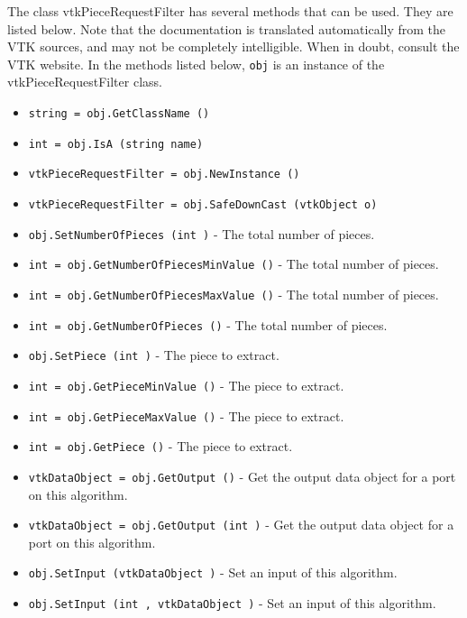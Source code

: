 The class vtkPieceRequestFilter has several methods that can be used.
  They are listed below.
Note that the documentation is translated automatically from the VTK sources,
and may not be completely intelligible.  When in doubt, consult the VTK website.
In the methods listed below, \verb|obj| is an instance of the vtkPieceRequestFilter class.
\begin{itemize}
\item  \verb|string = obj.GetClassName ()|

\item  \verb|int = obj.IsA (string name)|

\item  \verb|vtkPieceRequestFilter = obj.NewInstance ()|

\item  \verb|vtkPieceRequestFilter = obj.SafeDownCast (vtkObject o)|

\item  \verb|obj.SetNumberOfPieces (int )| -  The total number of pieces.

\item  \verb|int = obj.GetNumberOfPiecesMinValue ()| -  The total number of pieces.

\item  \verb|int = obj.GetNumberOfPiecesMaxValue ()| -  The total number of pieces.

\item  \verb|int = obj.GetNumberOfPieces ()| -  The total number of pieces.

\item  \verb|obj.SetPiece (int )| -  The piece to extract.

\item  \verb|int = obj.GetPieceMinValue ()| -  The piece to extract.

\item  \verb|int = obj.GetPieceMaxValue ()| -  The piece to extract.

\item  \verb|int = obj.GetPiece ()| -  The piece to extract.

\item  \verb|vtkDataObject = obj.GetOutput ()| -  Get the output data object for a port on this algorithm.

\item  \verb|vtkDataObject = obj.GetOutput (int )| -  Get the output data object for a port on this algorithm.

\item  \verb|obj.SetInput (vtkDataObject )| -  Set an input of this algorithm.

\item  \verb|obj.SetInput (int , vtkDataObject )| -  Set an input of this algorithm.

\end{itemize}
